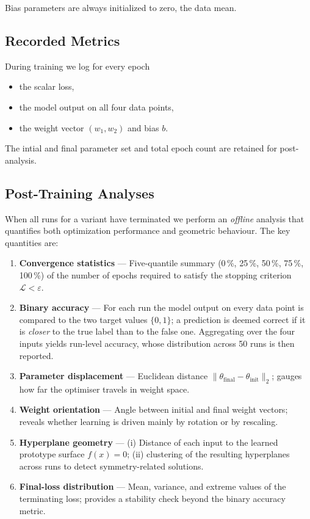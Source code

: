 Bias parameters are always initialized to zero, the data mean.

\subsection*{Recorded Metrics}

During training we log for every epoch
\begin{itemize}
  \item the scalar loss,
  \item the model output on all four data points,
  \item the weight vector \((w_1,w_2)\) and bias \(b\).
\end{itemize}
The intial and final parameter set and total epoch count are retained for post-analysis.

\subsection*{Post-Training Analyses}

When all runs for a variant have terminated we perform an \emph{offline}
analysis that quantifies both optimization performance and geometric
behaviour.  The key quantities are:

\begin{enumerate}[label=(A\arabic*)]
    \item \textbf{Convergence statistics} —  
          Five-quantile summary (0\,\%, 25\,\%, 50\,\%, 75\,\%, 100\,\%) of
          the number of epochs required to satisfy the stopping criterion
          \(\mathcal{L}<\varepsilon\).
    \item \textbf{Binary accuracy} —  
          For each run the model output on every data point is compared to the
          two target values \(\{0,1\}\); a prediction is deemed correct if it
          is \emph{closer} to the true label than to the false one.
          Aggregating over the four inputs yields run-level accuracy, whose
          distribution across 50 runs is then reported.
    \item \textbf{Parameter displacement} —  
          Euclidean distance
          \(\lVert\theta_{\text{final}}-\theta_{\text{init}}\rVert_2\); gauges
          how far the optimiser travels in weight space.
    \item \textbf{Weight orientation} —  
          Angle between initial and final weight vectors; reveals whether
          learning is driven mainly by rotation or by rescaling.
    \item \textbf{Hyperplane geometry} —  
          (i) Distance of each input to the learned prototype surface
          \(f(x)=0\);  
          (ii) clustering of the resulting hyperplanes across runs to detect
          symmetry-related solutions.
    \item \textbf{Final-loss distribution} —  
          Mean, variance, and extreme values of the terminating loss; provides
          a stability check beyond the binary accuracy metric.
\end{enumerate}

